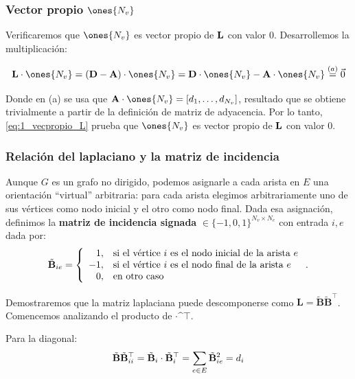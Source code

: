 \documentclass{article}
\begin{document}
\subsubsection{Vector propio $\ones{N_v}$}
\label{subsec:vector_propio_1}

Verificaremos que $\ones{N_v}$ es vector propio de $\mathbf{L}$ con valor 0. Desarrollemos la multiplicación:

\begin{equation}
    \lap \cdot \ones{N_v} = (\diag - \adj) \cdot \ones{N_v}  = \diag \cdot \ones{N_v} - \adj \cdot \ones{N_v} \stackrel{(a)}{=} \vec{0}
    \label{eq:1_vecpropio_L}
\end{equation}

Donde en (a) se usa que $\adj \cdot \ones{N_v} = [d_1, \dots, d_{N_v}]$, resultado que
se obtiene trivialmente a partir de la definición de matriz de adyacencia.
Por lo tanto, \eqref{eq:1_vecpropio_L} prueba que $\ones{N_v}$ es vector propio de $\mathbf{L}$ con valor 0.

\subsubsection{Relación del laplaciano y la matriz de incidencia}

Aunque $G$ es un grafo no dirigido, podemos asignarle a cada arista en $E$ una orientación ``virtual'' arbitraria: para cada arista elegimos arbitrariamente uno de sus vértices como nodo inicial y el otro como nodo final. Dada esa asignación, definimos la \textbf{matriz de incidencia signada} $\bm \in \{-1,0,1\}^{N_v\times N_e}$ con entrada $i,e$ dada por:
\begin{equation}
    \tilde{\mathbf{B}}_{ie} = \left\lbrace
    \begin{array}{r l}
        1,  & \text{si el vértice } i \text{ es el nodo inicial de la arista } e \\
        -1, & \text{si el vértice } i \text{ es el nodo final de la arista } e   \\
        0,  & \text{en otro caso}
    \end{array}
    \right. .
    \label{eq:matrix_incidencia}
\end{equation}

Demostraremos que la matriz laplaciana puede descomponerse como $\mathbf{L}=\tilde{\mathbf{B}}\tilde{\mathbf{B}}^\top$. Comencemos analizando el producto de $\bm\cdot\bm^\top$.

Para la diagonal:
\begin{equation}
    \label{eq:BB_ii}
    \tilde{\mathbf{B}}\tilde{\mathbf{B}}^\top_{ii} = \tilde{\mathbf{B}}_i \cdot \tilde{\mathbf{B}}_i^\top = \sum_{e\in E} \tilde{\mathbf{B}}_{ie}^2 = d_i
\end{equation}
\end{document}

